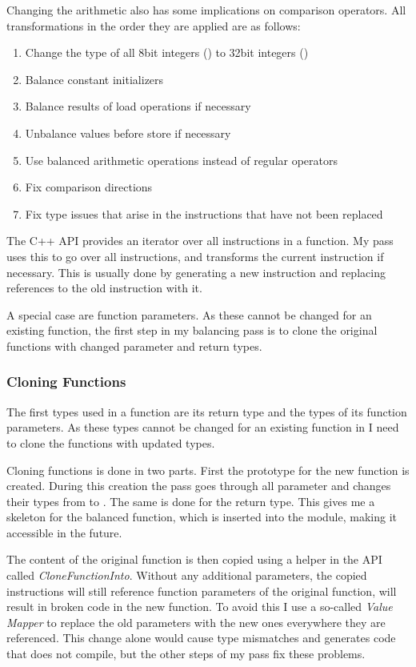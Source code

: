Changing the arithmetic also has some implications on comparison operators.
All transformations in the order they are applied are as follows:
\begin{enumerate}
\item Change the type of all 8bit integers () to 32bit integers ()
\item Balance constant initializers
\item Balance results of load operations if necessary
\item Unbalance values before store if necessary
\item Use balanced arithmetic operations instead of regular operators
\item Fix comparison directions
\item Fix type issues that arise in the instructions that have not been replaced
\end{enumerate}

The \llvm{} C++ API provides an iterator over all instructions in a function.
My pass uses this to go over all instructions, and transforms the current instruction if necessary.
This is usually done by generating a new \ir{} instruction and replacing references to the old instruction with it.

A special case are function parameters.
As these cannot be changed for an existing function, the first step in my balancing pass is to clone the original functions with changed parameter and return types.

\subsubsection{Cloning Functions}
The first types used in a function are its return type and the types of its function parameters.
As these types cannot be changed for an existing function in \llvm{} I need to clone the functions with updated types.

Cloning functions is done in two parts.
First the prototype for the new function is created.
During this creation the pass goes through all parameter and changes their types from  to .
The same is done for the return type.
This gives me a skeleton for the balanced function, which is inserted into the module, making it accessible in the future.

The content of the original function is then copied using a helper in the \llvm{} API called \emph{CloneFunctionInto}.
Without any additional parameters, the copied instructions will still reference function parameters of the original function, will result in broken code in the new function.
To avoid this I use a so-called \emph{Value Mapper} to replace the old parameters with the new ones everywhere they are referenced.
This change alone would cause type mismatches and generates code that does not compile, but the other steps of my pass fix these problems.

